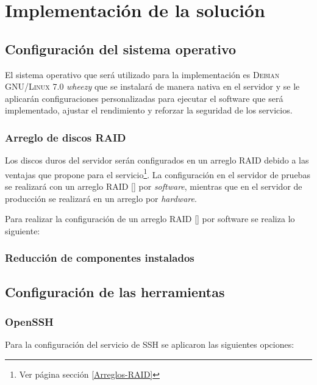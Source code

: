   \label{chap:cap3}

  \chapter {Implementaci\'{o}n de la soluci\'{o}n}

    \section {Configuraci\'{o}n del sistema operativo}

El sistema operativo que ser\'{a} utilizado para la implementaci\'{o}n es \textsc{Debian GNU/Linux} 7.0 \textit{\guillemotleft wheezy\guillemotright} que se instalar\'{a} de manera nativa en el servidor y se le aplicar\'{a}n configuraciones personalizadas para ejecutar el software que ser\'{a} implementado, ajustar el rendimiento y reforzar la seguridad de los servicios.

      \subsection {Arreglo de discos RAID}

Los discos duros del servidor ser\'{a}n configurados en un arreglo RAID debido a las ventajas que propone para el servicio\footnote{Ver p\'{a}gina \pageref{Arreglos-RAID} secci\'{o}n \ref{Arreglos-RAID}}. La configuraci\'{o}n en el servidor de pruebas se realizar\'{a} con un arreglo RAID [] por \textit{software}, mientras que en el servidor de producci\'{o}n se realizar\'{a} en un arreglo por \textit{hardware}.

Para realizar la configuraci\'{o}n de un arreglo RAID [] por software se realiza lo siguiente:

      \subsection {Reducci\'{o}n de componentes instalados}

    \section {Configuraci\'{o}n de las herramientas}

      \subsection {OpenSSH}

Para la configuraci\'{o}n del servicio de \textsc{SSH} se aplicaron las siguientes opciones:

